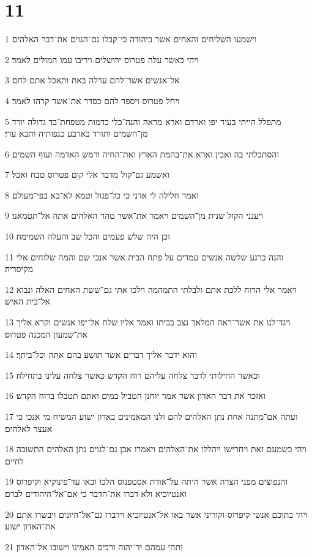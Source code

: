\chapter{11}

\par 1 וישמעו השליחים והאחים אשר ביהודה כי־קבלו גם־הגוים את־דבר האלהים׃
\par 2 ויהי כאשר עלה פטרוס ירושלים ויריבו עמו המולים לאמר׃
\par 3 אל־אנשים אשר־להם ערלה באת ותאכל אתם לחם׃
\par 4 ויחל פטרוס ויספר להם כסדר את־אשר קרהו לאמר׃
\par 5 מתפלל הייתי בעיר יפו וארדם וארא מראה והנה־כלי כדמות מטפחת־בד גדולה יורד מן־השמים ותורד בארבע כנפותיה ותבא עדי׃
\par 6 והסתכלתי בה ואבין וארא את־בהמת הארץ ואת־החיה ורמש האדמה ועוף השמים׃
\par 7 ואשמע גם־קול מדבר אלי קום פטרוס טבח ואכל׃
\par 8 ואמר חלילה לי אדני כי כל־פגול וטמא לא־בא בפי־מעולם׃
\par 9 ויענני הקול שנית מן־השמים ויאמר את־אשר טהר האלהים אתה אל־תטמאנו׃
\par 10 וכן היה שלש פעמים והכל שב והעלה השמימה׃
\par 11 והנה כרגע שלשה אנשים עמדים על פתח הבית אשר אנכי שם והמה שלוחים אלי מקיסריה׃
\par 12 ויאמר אלי הרוח ללכת אתם ולבלתי התמהמה וילכו אתי גם־ששת האחים האלה ונבוא אל־בית האיש׃
\par 13 ויגד־לנו את אשר־ראה המלאך נצב בביתו ואמר אליו שלח אל־יפו אנשים וקרא אליך את־שמעון המכנה פטרוס׃
\par 14 והוא ידבר אליך דברים אשר תושע בהם אתה וכל־ביתך׃
\par 15 וכאשר החילותי לדבר צלחה עליהם רוח הקדש כאשר צלחה עלינו בתחילה׃
\par 16 ואזכר את דבר האדון אשר אמר יוחנן הטביל במים ואתם תטבלו ברוח הקדש׃
\par 17 ועתה אם־מתנה אחת נתן האלהים להם ולנו המאמינים באדון ישוע המשיח מי אנכי כי אעצר לאלהים׃
\par 18 ויהי כשמעם זאת ויחרישו ויהללו את־האלהים ויאמרו אכן גם־לגוים נתן האלהים התשובה לחיים׃
\par 19 והנפוצים מפני הצרה אשר היתה על־אודת אסטפנוס הלכו ובאו עד־פינוקיא וקיפרוס ואנטיוכיא ולא דברו את־הדבר כי אם־אל־היהודים לבדם׃
\par 20 ויהי בתוכם אנשי קיפרוס וקוריני אשר באו אל־אנטיוכיא וידברו גם־אל־היונים ויבשרו אתם את־האדון ישוע׃
\par 21 ותהי עמהם יד־יהוה ורבים האמינו וישובו אל־האדון׃
